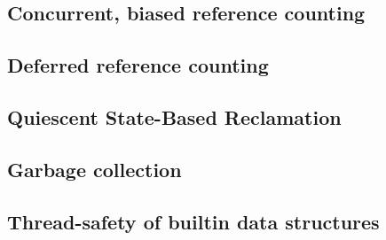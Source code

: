 \subsection{Concurrent, biased reference counting}\label{subsec:concurrent-biased-reference-counting}

\cite{biased-refcounting}

\subsection{Deferred reference counting}\label{subsec:deferred-reference-counting}

\cite{deferred-refcounting}

\subsection{Quiescent State-Based Reclamation}\label{subsec:qsbr}

\cite{qsbr}

\subsection{Garbage collection}\label{subsec:python-gc}

\cite{pep703}

\subsection{Thread-safety of builtin data structures}\label{subsec:thread-safety-of-builtin-data-structures}

\cite[\S Container Thread-Safety]{pep703}
